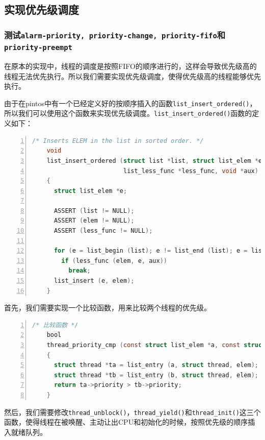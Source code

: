\documentclass{article}
\begin{document}
\subsection{实现优先级调度}

\subsubsection{测试\texttt{alarm-priority, priority-change, priority-fifo}和\texttt{priority-preempt}}


在原本的实现中，线程的调度是按照FIFO的顺序进行的，这样会导致优先级高的线程无法优先执行。所以我们需要实现优先级调度，使得优先级高的线程能够优先执行。

由于在pintos中有一个已经定义好的按顺序插入的函数\texttt{list\_insert\_ordered()}，所以我们可以使用这个函数来实现优先级调度。\texttt{list\_insert\_ordered()}函数的定义如下：

\begin{lstlisting}[xleftmargin = 4em,xrightmargin = 3em, aboveskip = 1em, numbers = left, language = C, title=\texttt{list\_insert\_ordered()}函数的定义]
    /* Inserts ELEM in the list in sorted order. */
    void
    list_insert_ordered (struct list *list, struct list_elem *elem,
                         list_less_func *less_func, void *aux)
    {
      struct list_elem *e;
    
      ASSERT (list != NULL);
      ASSERT (elem != NULL);
      ASSERT (less_func != NULL);
    
      for (e = list_begin (list); e != list_end (list); e = list_next (e))
        if (less_func (elem, e, aux))
          break;
      list_insert (e, elem);
    }

\end{lstlisting}


首先，我们需要实现一个比较函数，用来比较两个线程的优先级。

\begin{lstlisting}[xleftmargin = 4em,xrightmargin = 3em, aboveskip = 1em, numbers = left, language = C, title=比较函数]
    /* 比较函数 */
    bool
    thread_priority_cmp (const struct list_elem *a, const struct list_elem *b, void *aux UNUSED)
    {
      struct thread *ta = list_entry (a, struct thread, elem);
      struct thread *tb = list_entry (b, struct thread, elem);
      return ta->priority > tb->priority;
    }

\end{lstlisting}

然后，我们需要修改\texttt{thread\_unblock()}，\texttt{thread\_yield()}和\texttt{thread\_init()}这三个函数，使得线程在被唤醒、主动让出CPU和初始化的时候，按照优先级的顺序插入就绪队列。
\end{document}
